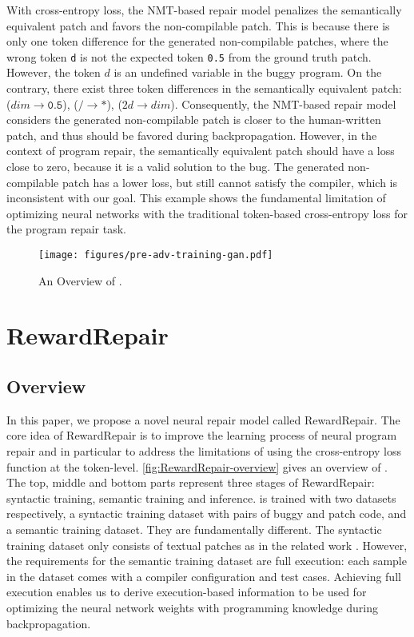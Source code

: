 With cross-entropy loss, the NMT-based repair model penalizes the semantically equivalent patch and favors the non-compilable patch.  
This is because there is only one token difference for the generated non-compilable patches, where the wrong token \texttt{d} is not the expected token \texttt{0.5} from the ground truth patch.
However, the token $d$ is an undefined variable in the buggy program. 
On the contrary, there exist three token differences in the semantically equivalent patch: ($dim \rightarrow \texttt{0.5}$), ($/\rightarrow *$), ($2d \rightarrow  dim$). 
Consequently, the NMT-based repair model considers the generated 
non-compilable patch is closer to the human-written patch, and thus should be favored during backpropagation.
However, in the context of program repair, the semantically equivalent patch should have a loss close to zero, because it is a valid solution to the bug.
The generated non-compilable patch  has a  lower loss, but still cannot satisfy the compiler, which is inconsistent with our goal.
This example shows the fundamental limitation of optimizing neural networks with the traditional token-based cross-entropy loss for the program repair task.

\begin{figure*}
\texttt{[image: figures/pre-adv-training-gan.pdf]} 
 \caption{An Overview of \approach. }
\label{fig:RewardRepair-overview}
\end{figure*}

\section{RewardRepair}
\label{sec:rewardrepair}

\subsection{Overview}
\label{sec:overview}

In this paper, we propose a novel neural repair model called
RewardRepair.
The core idea of RewardRepair is to improve the learning process of neural program repair and in particular to address the limitations of using the cross-entropy loss function at the token-level. 
\autoref{fig:RewardRepair-overview} gives an overview of \approach.
The top, middle and bottom parts represent three stages of RewardRepair: syntactic training, semantic training and inference. 
\approach is trained with two datasets respectively, a syntactic training dataset with pairs of buggy and patch code, and a semantic training dataset.
They are fundamentally different. The syntactic training dataset only consists of textual patches as in the related work \cite{CURE-icse21,CoCoNuT,SEQUENCER}.
However, the requirements for the semantic training dataset are full execution: each sample in the dataset comes with a compiler configuration and test cases. Achieving full execution enables us to derive execution-based information to be used for optimizing the neural network weights with programming knowledge during backpropagation.

